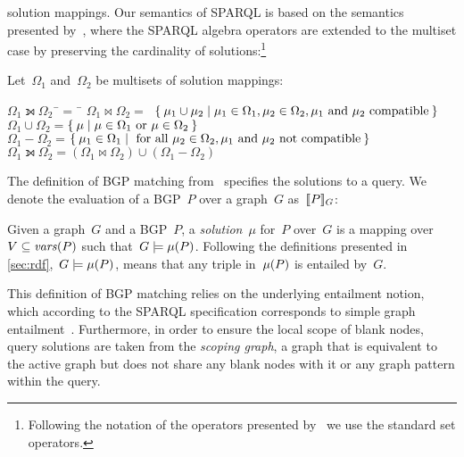 solution mappings.
%
Our semantics of SPARQL is based on the semantics presented by~\citet{ArenasGutierrezPerez:2009ab}, where the SPARQL
algebra operators are extended to the multiset case by preserving the cardinality of solutions:\footnote{Following the
  notation of the operators presented by~\citet{ArenasGutierrezPerez:2009ab} we use the standard set operators.}
%
\begin{definition}
 \label{def:sparql-relalg}
 Let~$\Omega_1$ and~$\Omega_2$ be multisets of solution mappings:
 \begin{tabbing}
   $\Omega_1 \leftouterjoin \Omega_2$\ \=$=$\ \=\kill
   $\Omega_1 \bowtie \Omega_2$\>$=$\ \>$\left\{\: \mu_1 \cup \mu_2 \mid \mu_1 \in \Omega_1, \mu_2 \in \Omega_2,\mu_1\textrm{ and }\mu_2\textrm{ compatible} \:\right\}$\\
   $\Omega_1 \cup \Omega_2$\>$=$\>$\left\{\: \mu \mid \mu \in \Omega_1\textrm{ or } \mu \in \Omega_2 \:\right\}$\\
   $\Omega_1 - \Omega_2$\>$=$\>$\left\{\: \mu_1 \in \Omega_1 \mid \textrm{ for all }\mu_2 \in \Omega_2,\mu_1\textrm{ and }\mu_2\textrm{ not compatible} \:\right\}$\\
   $\Omega_1 \leftouterjoin \Omega_2$\>$=$\>$(\Omega_1 \bowtie \Omega_2) \cup (\Omega_1 - \Omega_2)$
   \end{tabbing}
\end{definition}


\noindent The definition of BGP matching from~\citet[Section~12.3]{PrudhommeauxSeaborne:2008aa} specifies the solutions
to a query.  We denote the evaluation of a \ac{BGP}~$P$ over a graph~$G$ as~$[\![ P ]\!]_{G}$:
%
\begin{definition}
  \label{def:bgp-matching}
  Given a graph~$G$ and a \ac{BGP}~$P$, a \emph{solution}~$\mu$ for~$P$ over~$G$ is a mapping over~$V \subseteq
  \mathit{vars}\!\left(P\right)$ such that~$G \models \mathit{\mu}\!\left(P\right)$.  Following the definitions presented in \cref{sec:rdf},~$G \models
  \mathit{\mu}\!\left(P\right)$, means that any triple in~$\mathit{\mu}\!\left(P\right)$ is entailed by~$G$.
\end{definition}
%
\noindent This definition of \ac{BGP} matching relies on the underlying entailment notion, which according to the SPARQL
specification corresponds to simple graph entailment~\cite{Hayes:2004aa}.
%
Furthermore, in order to ensure the local scope of blank nodes, query solutions are taken from the \emph{scoping graph},
a graph that is equivalent to the active graph but does not share any blank nodes with it or any graph pattern within
the query.
%

